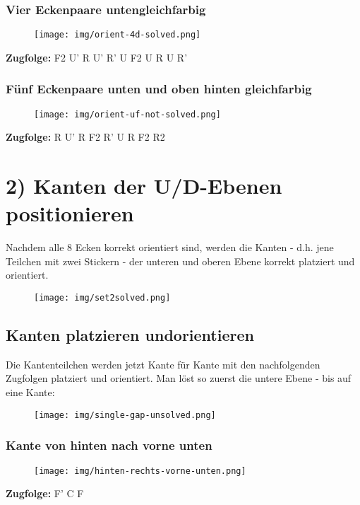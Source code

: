 \documentclass[letterpaper,10pt,twoside,twocolumn,openany]{book}
\begin{document}
\subsubsection{Vier Eckenpaare unten\newline gleichfarbig}
\begin{figure}[!htb] 
  \centering
     \texttt{[image: img/orient-4d-solved.png]}
\end{figure}
\centering \textbf{Zugfolge:} F2 U' R U' R' U F2 U R U R' 

\subsubsection{Fünf Eckenpaare unten und oben hinten gleichfarbig}
\begin{figure}[!htb] 
  \centering
     \texttt{[image: img/orient-uf-not-solved.png]}
\end{figure}
\centering \textbf{Zugfolge:} R U' R F2 R' U R F2 R2 
        
\section{2) Kanten der U/D-Ebenen positionieren}
\begin{justify}
Nachdem alle 8 Ecken korrekt orientiert sind, werden die Kanten - d.h. jene Teilchen mit zwei Stickern - der unteren und oberen Ebene korrekt platziert und orientiert. 
\end{justify}
\begin{figure}[!htb] 
  \centering
     \texttt{[image: img/set2solved.png]}
\end{figure}

\subsection{Kanten platzieren und\newline orientieren}
\begin{justify}
Die Kantenteilchen werden jetzt Kante für Kante mit den nachfolgenden Zugfolgen platziert und orientiert. Man löst so zuerst die untere Ebene - bis auf eine Kante:
\begin{figure}[!htb] 
  \centering
     \texttt{[image: img/single-gap-unsolved.png]}
\end{figure}
\end{justify}

\subsubsection{Kante von hinten nach vorne unten}
\begin{figure}[!htb] 
  \centering
     \texttt{[image: img/hinten-rechts-vorne-unten.png]}
\end{figure}
\centering \textbf{Zugfolge:} F' C F
\end{document}
